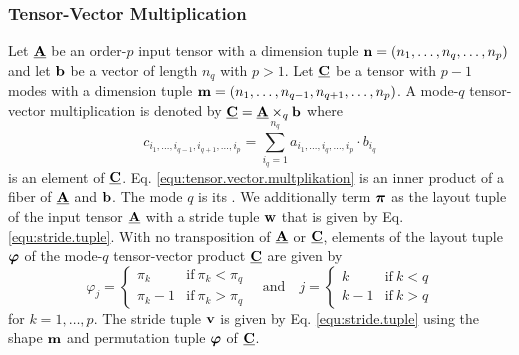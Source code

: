 \subsubsection{Tensor-Vector Multiplication}
Let $\underline{\mathbf{A}}$ be an order-$p$ input tensor with a dimension tuple $\mathbf{n} = (n_1,\dots,n_q,\dots,n_p)$ and let $\mathbf{b}$ be a vector of length $n_q$ with $p>1$. 
Let $\underline{\mathbf{C}}$ be a tensor with $p-1$ modes with a dimension tuple $\mathbf{m} =(n_1,\dots,n_{q-1},n_{q+1},\dots,n_p)$.
A mode-$q$ tensor-vector multiplication is denoted by $\underline{\mathbf{C}} = \underline{\mathbf{A}} \times_q \mathbf{b}$ where
\begin{equation}
\label{equ:tensor.vector.multplikation}
c_{i_1, \dots, i_{q-1}, i_{q+1}, \dots, i_p} = \sum_{i_q=1}^{n_q} a_{i_1, \dots, i_q, \dots, i_p} \cdot b_{i_q}
\end{equation}
is an element of $\underline{\mathbf{C}}$.
Eq. \eqref{equ:tensor.vector.multplikation} is an inner product of a fiber of $\underline{\mathbf{A}}$ and $\mathbf{b}$.%
The mode $q$ is its  .
We additionally term $\boldsymbol{\pi}$ as the layout tuple of the input tensor $\underline{\mathbf{A}}$ with a stride tuple $\mathbf{w}$ that is given by Eq. \eqref{equ:stride.tuple}.
With no transposition of $\underline{\mathbf{A}}$ or $\underline{\mathbf{C}}$, elements of the layout tuple $\boldsymbol{\varphi}$ of the mode-$q$ tensor-vector product $\underline{\mathbf{C}}$ are given by
\begin{equation}
\label{equ:tensor.times.vector.output.format}
\varphi_j = 
\begin{cases}
\pi_k       & \text{if} \ \pi_k < \pi_q\\ %
\pi_k-1     & \text{if} \ \pi_k > \pi_q %
\end{cases}
\quad \text{and} \quad
j = 
\begin{cases}
k   & \text{if} \ k < q \\
k-1 & \text{if} \ k > q 
\end{cases} 
\end{equation}
for $k=1,\dots,p$.
The stride tuple $\mathbf{v}$ is given by Eq. \eqref{equ:stride.tuple} using the shape $\mathbf{m}$ and permutation tuple $\boldsymbol{\varphi}$ of $\underline{\mathbf{C}}$. 


